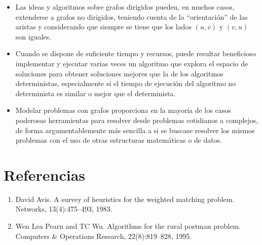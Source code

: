 \documentclass[11pt]{article}
\begin{document}
\begin{itemize}
   \item Las ideas y algoritmos sobre grafos dirigidos pueden, en
   muchos casos, extenderse a grafos no dirigidos, teniendo cuenta
   de la ``orientación'' de las aristas y considerando que siempre se 
   tiene que los lados $(u, v)$ y $(v, u)$ son iguales.

   \item Cuando se dispone de suficiente tiempo y recursos, puede
   resultar beneficioso implementar y ejecutar varias veces un
   algoritmo que explora el espacio de soluciones para obtener
   soluciones mejores que la de los algoritmos deterministas, 
   especialmente si el tiempo de ejecución del algoritmo no
   determinista es similar o mejor que el determinista.

   \item Modelar problemas con grafos proporciona en la mayoría de
   los casos poderosas herramientas para resolver desde problemas
   cotidianos a complejos, de forma argumentablemente más sencilla
   a si se buscase resolver los mismos problemas con el uso de 
   otras estructuras matemáticas o de datos.

\end{itemize}

\section{Referencias}

\begin{enumerate}
   \item David Avis. A survey of heuristics for the weighted matching problem. Networks,
   13(4):475–493, 1983.
   \item Wen Lea Pearn and TC Wu. Algorithms for the rural postman problem. Computers \& Operations Research, 22(8):819–828, 1995.
\end{enumerate}
\end{document}
